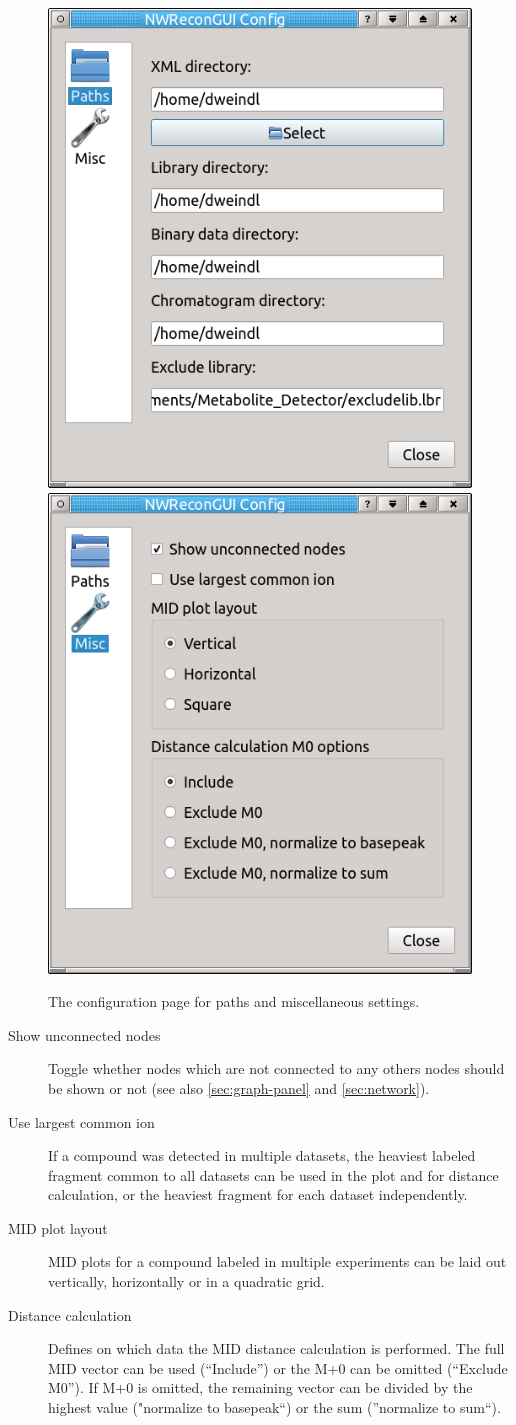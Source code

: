 \documentclass[a4paper,12pt]{scrartcl}
\begin{document}
\begin{figure}[htb]
 \centering
 \includegraphics[width=0.4\linewidth]{./gfx/ss_settings_paths.png}
 \label{fig:settings_paths}
 \includegraphics[width=0.4\linewidth]{./gfx/ss_settings_misc.png}
 \caption{The configuration page for paths and miscellaneous settings.}
 \label{fig:settings_misc}
\end{figure}

\begin{description}
 \item[Show unconnected nodes]
 Toggle whether nodes which are not connected to any others nodes should be shown or not (see also \ref{sec:graph-panel} and \ref{sec:network}).
 
 \item[Use largest common ion]
 If a compound was detected in multiple datasets, the heaviest labeled fragment common to all datasets can be used in the plot and for distance calculation, or the heaviest fragment for each dataset independently.
 
 \item[MID plot layout]
 MID plots for a compound labeled in multiple experiments can be laid out vertically, horizontally or in a quadratic grid.
 
 \item[Distance calculation]
 Defines on which data the MID distance calculation is performed. The full MID vector can be used (``Include'') or the M+0 can be omitted (``Exclude M0''). If M+0 is omitted, the remaining vector can be divided by the highest value ("normalize to basepeak``) or the sum (''normalize to sum``).
 
\end{description}
\end{document}
